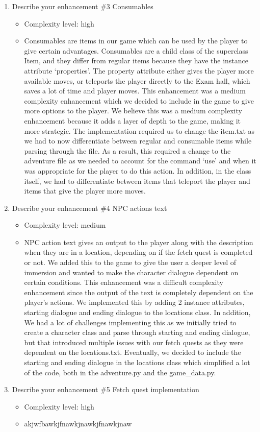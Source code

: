 \documentclass[11pt]{article}
\begin{document}
\begin{enumerate}
\item Describe your enhancement \#3 Consumables
	\begin{itemize}
	\item Complexity level: high
    \item Consumables are items in our game which can be used by the player to give certain advantages. Consumables are a child class of the superclass Item, and they differ from regular items because they have the instance attribute ‘properties’. The property attribute either gives the player more available moves, or teleports the player directly to the Exam hall, which saves a lot of time and player moves. This enhancement was a medium complexity enhancement which we decided to include in the game to give more options to the player. We believe this was a medium complexity enhancement because it adds a layer of depth to the game, making it more strategic. The implementation required us to change the item.txt as we had to now differentiate between regular and consumable items while parsing through the file. As a result, this required a change to the adventure file as we needed to account for the command ‘use’ and when it was appropriate for the player to do this action. In addition, in the class itself, we had to differentiate between items that teleport the player and items that give the player more moves.
	\end{itemize}

\item Describe your enhancement \#4 NPC actions text
	\begin{itemize}
	\item Complexity level: medium
	\item NPC action text gives an output to the player along with the description when they are in a location, depending on if the fetch quest is completed or not. We added this to the game to give the user a deeper level of immersion and wanted to make the character dialogue dependent on certain conditions. This enhancement was a difficult complexity enhancement since the output of the text is completely dependent on the player's actions. We implemented this by adding 2 instance attributes, starting dialogue and ending dialogue to the locations class. In addition, We had a lot of challenges implementing this as we initially tried to create a character class and parse through starting and ending dialogue, but that introduced multiple issues with our fetch quests as they were dependent on the locations.txt. Eventually, we decided to include the starting and ending dialogue in the locations class which simplified a lot of the code, both in the adventure.py and the game_data.py.
	\end{itemize}

\item Describe your enhancement \#5 Fetch quest implementation
	\begin{itemize}
	\item Complexity level: high
    \item akjwfbawkjfnawkjnawkjfnawkjnaw
	\end{itemize}

\end{enumerate}
\end{document}
